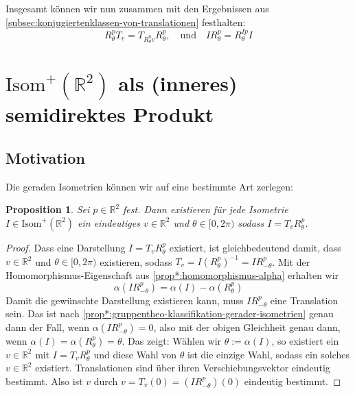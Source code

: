 \documentclass[a4paper, ngerman]{article}
\newcounter{chapter}
\numberwithin{equation}{chapter}
\theoremstyle{plain}
\newtheorem{proposition}{Proposition}[chapter]
\theoremstyle{definition}
\newcommand{\geradisometr}{\ensuremath{\mathrm{Isom}^+(\mathbb R^2)}}
\begin{document}
Insgesamt können wir nun zusammen mit den Ergebnissen aus \cref{subsec:konjugiertenklassen-von-translationen} festhalten:
\begin{equation}\label{eq:konjugations-relationen}
    R_\theta^p T_v = T_{R_\theta^0 v} R_\theta^p, \quad \text{und} \quad IR_\theta^p = R_\theta^{Ip}I
\end{equation}

\section{\(\geradisometr\) als (inneres) semidirektes Produkt}

\subsection{Motivation}
Die geraden Isometrien können wir auf eine bestimmte Art zerlegen: 
\begin{proposition}\label{prop:zerlegung-gerader-isometrien}
    Sei \(p \in \mathbb R^2\) fest. Dann existieren für jede Isometrie \(I \in \geradisometr\) ein eindeutiges \(v \in \mathbb R^2\) und \(\theta \in [0,2\pi)\) sodass \(I = T_v R_\theta^p\).  
\end{proposition}
\begin{proof}
    Dass eine Darstellung \(I = T_v R_\theta^p\) existiert, ist gleichbedeutend damit, dass \(v \in \mathbb R^2\) und \(\theta\in [0,2\pi)\) existieren, sodass \(T_v = I(R_\theta^p)^{-1} = I R_{-\theta}^p\). Mit der Homomorphismus-Eigenschaft aus \cref{prop*:homomorphismus-alpha} erhalten wir 
    \begin{equation*}
        \alpha(IR_{-\theta}^p) = \alpha(I) - \alpha(R_\theta^p)
    \end{equation*}
    Damit die gewünschte Darstellung existieren kann, muss \(IR_{-\theta}^p\) eine Translation sein. Das ist nach \cref{prop*:gruppentheo-klassifikation-gerader-isometrien} genau dann der Fall, wenn \(\alpha(IR_{-\theta}^p) = 0\), also mit der obigen Gleichheit genau dann, wenn \(\alpha(I) = \alpha(R_\theta^p) = \theta\). Das zeigt: Wählen wir \(\theta := \alpha(I)\), so existiert ein \(v \in \mathbb R^2\) mit \(I = T_v R_\theta^p\) und diese Wahl von \(\theta\) ist die einzige Wahl, sodass ein solches \(v \in \mathbb R^2\) existiert. Translationen sind über ihren Verschiebungsvektor eindeutig bestimmt. Also ist \(v\) durch \(v = T_v(0) = (IR_{-\theta}^p) (0)\) eindeutig bestimmt. 
\end{proof}
\end{document}
